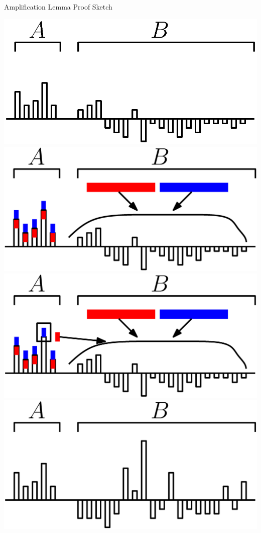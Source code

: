 \documentclass[xcolor=x11names, svgnames, rgb]{beamer}
\begin{document}
\begin{frame}[t]{Amplification Lemma Proof Sketch}
  \begin{overprint}
     \includegraphics[width=\linewidth]{amppf/ani0.eps}
     \includegraphics[width=\linewidth]{amppf/neglect0.eps}
     \includegraphics[width=\linewidth]{amppf/neglect1.eps}
     \includegraphics[width=\linewidth]{amppf/ani1.eps}

\end{overprint}
\end{frame}
\end{document}

